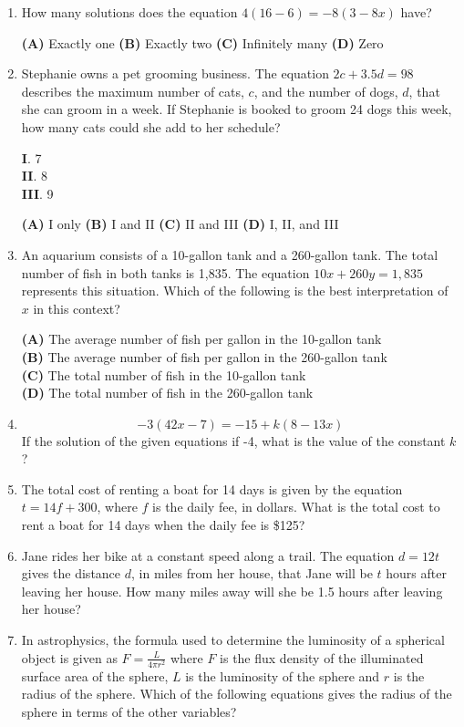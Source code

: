 \documentclass[../satmath.tex]{subfiles}
\begin{document}
\begin{enumerate}[label=\bfseries\arabic*.]
\item 
How many solutions does the equation $4(16-6)=-8(3-8x)$ have?

\textbf{(A) } Exactly one \qquad \textbf{(B) } Exactly two \qquad \textbf{(C) } Infinitely many \qquad \textbf{(D) } Zero 

\item 
Stephanie owns a pet grooming business. The equation $2c+3.5d=98$ describes the maximum number of cats, $c$, and the number of dogs, $d$,
that she can groom in a week. If Stephanie is booked to groom 24 dogs this week, how many cats could she add to her schedule?

\textbf{I}. 7\\
\textbf{II}. 8\\
\textbf{III}. 9

\textbf{(A) } I only \qquad \textbf{(B) } I and II \qquad \textbf{(C) } II and III \qquad \textbf{(D) } I, II, and III 

\item 
An aquarium consists of a 10-gallon tank and a 260-gallon tank. The total number of fish in both tanks is 1,835. The equation $10x+260y=1,835$ 
represents this situation. Which of the following is the best interpretation of $x$ in this context?

\textbf{(A) } The average number of fish per gallon in the 10-gallon tank\\
\textbf{(B) } The average number of fish per gallon in the 260-gallon tank\\
\textbf{(C) } The total number of fish in the 10-gallon tank\\
\textbf{(D) } The total number of fish in the 260-gallon tank 

\item
\[-3(42x-7)=-15+k(8-13x)\]
If the solution of the given equations if -4, what is the value of the constant $k$?

\item 
The total cost of renting a boat for 14 days is given by the equation $t=14f+300$, where $f$ is the daily fee, in dollars. What is the total 
cost to rent a boat for 14 days when the daily fee is \$125? 

\item 
Jane rides her bike at a constant speed along a trail. The equation $d=12t$ gives the distance $d$, in miles from her house, that Jane will be 
$t$ hours after leaving her house. How many miles away will she be 1.5 hours after leaving her house?

\item 
In astrophysics, the formula used to determine the luminosity of a spherical object is given as $F=\frac{L}{4\pi r^2}$ where $F$ is the 
flux density of the illuminated surface area of the sphere, $L$ is the luminosity of the sphere and $r$ is the radius of the sphere. Which of the following 
equations gives the radius of the sphere in terms of the other variables?


\end{enumerate}
\end{document}
